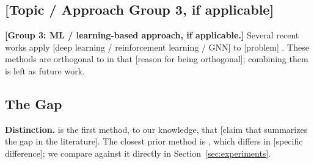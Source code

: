\subsection{[Topic / Approach Group 3, if applicable]}
\label{sec:bg_group3}

\textbf{[Group 3: ML / learning-based approach, if applicable.]}
Several recent works apply [deep learning / reinforcement learning / GNN]
to [problem] \cite{PLACEHOLDER_ml_a, PLACEHOLDER_ml_b}.
These methods are orthogonal to \method{} in that [reason for being
orthogonal]; combining them is left as future work.

\subsection{The Gap}
\label{sec:bg_gap}

\textbf{Distinction.} \method{} is the first method, to our knowledge,
that [claim that summarizes the gap in the literature]. The closest prior
method is \cite{PLACEHOLDER_closest}, which differs in [specific
difference]; we compare against it directly in
Section~\ref{sec:experiments}.

